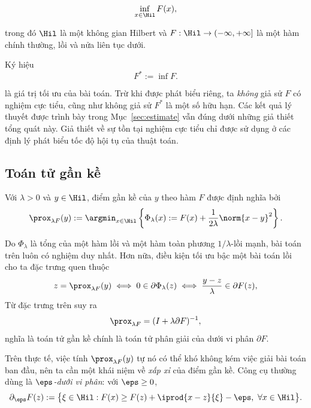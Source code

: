 $$\inf_{x\in\Hil}F(x),$$

trong đó $\Hil$ là một không gian Hilbert và $F:\Hil\to(-\infty,+\infty]$ là một hàm chính thường, lồi và nửa liên tục dưới.

Ký hiệu $$F^*:=\inf F.$$

là giá trị tối ưu của bài toán. Trừ khi được phát biểu riêng, ta \emph{không} giả sử $F$ có nghiệm cực tiểu, cũng như không giả sử $F^*$ là một số hữu hạn. Các kết quả lý thuyết được trình bày trong Mục~\ref{sec:estimate} vẫn đúng dưới những giả thiết tổng quát này. Giả thiết về sự tồn tại nghiệm cực tiểu chỉ được sử dụng ở các định lý phát biểu tốc độ hội tụ của thuật toán.

\subsection{Toán tử gần kề}
\begin{definition}
Với $\lambda>0$ và $y\in\Hil$, điểm gần kề của $y$ theo hàm $F$ được định nghĩa bởi
\begin{equation}
    \prox_{\lambda F}(y)
    :=
    \argmin_{x\in\Hil}
    \left\{
    \Phi_\lambda(x)
    :=
    F(x)
    +
    \frac1{2\lambda}\norm{x-y}^2
    \right\}.
\end{equation}
\end{definition}

Do $\Phi_\lambda$ là tổng của một hàm lồi và một hàm toàn phương
$1/\lambda$-lồi mạnh, bài toán trên luôn có nghiệm duy nhất. Hơn nữa,
điều kiện tối ưu bậc một bài toán lồi cho ta đặc trưng quen thuộc
\begin{equation}
  z = \prox_{\lambda F}(y)
  \iff 0 \in \partial \Phi_\lambda(z)
  \iff \frac{y-z}{\lambda} \in \partial F(z),
  \label{eq:opt-cond}
\end{equation}
Từ đặc trưng trên suy ra $$\prox_{\lambda F}=(I+\lambda\partial F)^{-1},$$ nghĩa là toán tử gần kề chính là toán tử phân giải của dưới vi phân $\partial F$.

Trên thực tế, việc tính $\prox_{\lambda F}(y)$ tự nó có thể khó không kém việc giải bài toán ban đầu, nên ta cần một khái niệm về \emph{xấp xỉ} của điểm gần kề. Công cụ thường dùng là \emph{$\eps$-dưới vi phân}: với $\eps\ge 0$,
\begin{equation}
  \partial_\eps F(z) := \big\{ \xi\in\Hil :
     F(x) \ge F(z) + \iprod{x-z}{\xi} - \eps,\ \forall x\in\Hil \big\}.
  \label{eq:eps-subdiff}
\end{equation}

